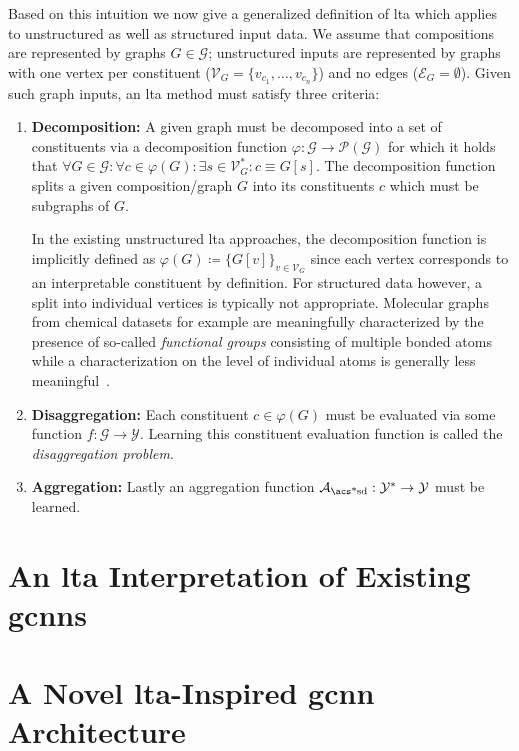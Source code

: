 Based on this intuition we now give a generalized definition of \ac{lta} which applies to unstructured as well as structured input data.
We assume that compositions are represented by graphs $G \in \mathcal{G}$;
unstructured inputs are represented by graphs with one vertex per constituent ($\mathcal{V}_G = \{ v_{c_1}, \dots, v_{c_n} \}$) and no edges ($\mathcal{E}_G = \emptyset$).
Given such graph inputs, an \ac{lta} method must satisfy three criteria:
\begin{enumerate}[label=\textbf{\arabic*.}]
	\item \textbf{Decomposition:}
		A given graph must be decomposed into a set of constituents via a decomposition function $\varphi: \mathcal{G} \to \mathcal{P}(\mathcal{G})$ for which it holds that $\forall G \in \mathcal{G}: \forall c \in \varphi(G): \exists s \in \mathcal{V}_G^{*}: c \equiv G[s]$.
		The decomposition function splits a given composition/graph $G$ into its constituents $c$ which must be subgraphs of $G$.

		In the existing unstructured \ac{lta} approaches, the decomposition function is implicitly defined as $\varphi(G) \coloneqq {\{ G[v] \}}_{v \in \mathcal{V}_G}$ since each vertex corresponds to an interpretable constituent by definition.
		For structured data however, a split into individual vertices is typically not appropriate.
		Molecular graphs from chemical datasets for example are meaningfully characterized by the presence of so-called \textit{functional groups} consisting of multiple bonded atoms while a characterization on the level of individual atoms is generally less meaningful~\cite{McNaught1997}.
	\item \textbf{Disaggregation:}
		Each constituent $c \in \varphi(G)$ must be evaluated via some function $f: \mathcal{G} \to \mathcal{Y}$.
		Learning this constituent evaluation function is called the \textit{disaggregation problem}.
	\item \textbf{Aggregation:}
		Lastly an aggregation function $\mathcal{A}_{\text{\acs*{sd}}}: \mathcal{Y}^{*} \to \mathcal{Y}$ must be learned.
\end{enumerate}

\section{An \acs*{lta} Interpretation of Existing \acsp*{gcnn}}%
\label{sec:ltag:interpretation}

\section{A Novel \acs*{lta}-Inspired \acs*{gcnn} Architecture}%
\label{sec:ltag:wl2gnn}
